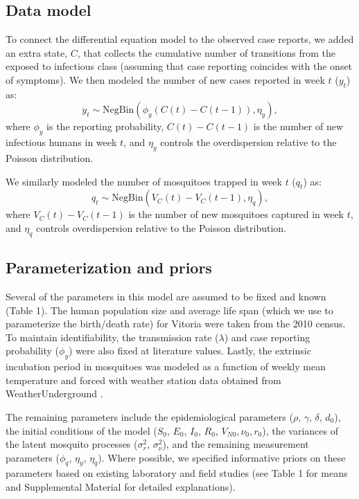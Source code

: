 \documentclass[10pt,letterpaper]{article}
\begin{document}
\subsection*{Data model}

To connect the differential equation model to the observed case reports, we added an extra state, $C$, that collects the cumulative number of transitions from the exposed to infectious class (assuming that case reporting coincides with the onset of symptoms).
We then modeled the number of new cases reported in week $t$ ($y_t$) as:
\begin{equation}
y_t  \sim \text{NegBin}(\phi_y (C(t) - C(t-1)), \eta_y),
\end{equation}
where $\phi_y$ is the reporting probability, $C(t) - C(t-1)$ is the number of new infectious humans in week $t$, and $\eta_y$ controls the overdispersion relative to the Poisson distribution.

We similarly modeled the number of mosquitoes trapped in week $t$ ($q_t$) as:
\begin{equation}
q_t \sim \text{NegBin}(V_{C}(t) - V_{C}(t-1), \eta_q),
\end{equation}
where $V_{C}(t) - V_{C}(t-1)$ is the number of new mosquitoes captured in week $t$, and $\eta_q$ controls overdispersion relative to the Poisson distribution.

\subsection*{Parameterization and priors}

Several of the parameters in this model are assumed to be fixed and known (Table 1).
The human population size and average life span (which we use to parameterize the birth/death rate) for Vitoria were taken from the 2010 census.
To maintain identifiability, the transmission rate ($\lambda$) and case reporting probability ($\phi_y$) were also fixed at literature values.
Lastly, the extrinsic incubation period in mosquitoes was modeled as a function of weekly mean temperature and forced with weather station data obtained from WeatherUnderground \cite{weather}.

The remaining parameters include the epidemiological parameters ($\rho$, $\gamma$, $\delta$, $d_0$), the initial conditions of the model ($S_0$, $E_0$, $I_0$, $R_0$, $V_{N0}, \nu_0, r_0$), the variances of the latent mosquito processes ($\sigma^2_r$, $\sigma^2_{\nu}$), and the remaining measurement parameters ($\phi_q$, $\eta_y$, $\eta_q$).  
Where possible, we specified informative priors on these parameters based on existing laboratory and field studies (see Table 1 for means and Supplemental Material for detailed explanations).
\end{document}
